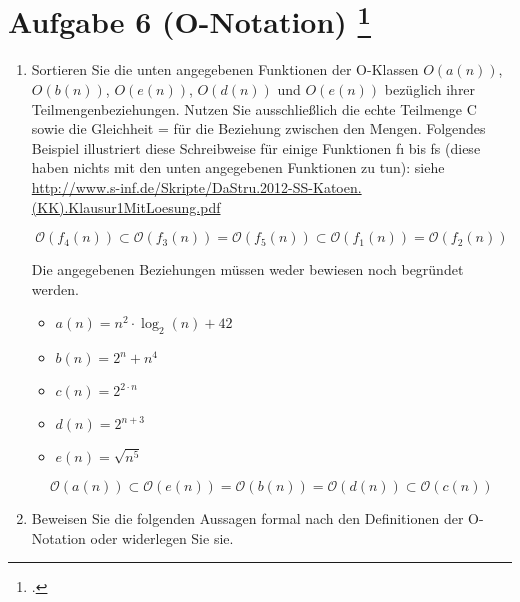 \documentclass{lehramt-informatik-aufgabe}
\begin{document}
\section{Aufgabe 6 (O-Notation)
\footcite{66115:2019:09}}

\begin{enumerate}


\item Sortieren Sie die unten angegebenen Funktionen der
O-Klassen $O(a(n))$, $O(b(n))$, $O(e(n))$, $O(d(n))$ und $O(e(n))$
bezüglich ihrer Teilmengenbeziehungen. Nutzen Sie ausschließlich die
echte Teilmenge C sowie die Gleichheit = für die Beziehung zwischen den
Mengen. Folgendes Beispiel illustriert diese Schreibweise für einige
Funktionen fı bis fs (diese haben nichts mit den unten angegebenen
Funktionen zu tun):
siehe \url{http://www.s-inf.de/Skripte/DaStru.2012-SS-Katoen.(KK).Klausur1MitLoesung.pdf}

\begin{displaymath}
\mathcal{O}(f_4 (n)) \subset \mathcal{O}(f_3(n)) = \mathcal{O}(f_5(n)) \subset \mathcal{O}(f_1(n)) = \mathcal{O}(f_2(n))
\end{displaymath}

Die angegebenen Beziehungen müssen weder bewiesen noch begründet werden.

\begin{itemize}
\item $a(n) = n^2 \cdot \log_2(n) + 42$
\item $b(n) = 2^n + n^4$
\item $c(n) = 2^{2 \cdot n}$
\item $d(n) = 2^{n+3}$
\item $e(n) = \sqrt{n^5}$
\end{itemize}

\begin{antwort}
\begin{displaymath}
\mathcal{O}(a (n)) \subset \mathcal{O}(e(n)) = \mathcal{O}(b(n)) = \mathcal{O}(d(n)) \subset \mathcal{O}(c(n))
\end{displaymath}
\end{antwort}


\item Beweisen Sie die folgenden Aussagen formal nach den Definitionen
der O-Notation oder widerlegen Sie sie.

\begin{enumerate}


\end{enumerate}
\end{enumerate}
\end{document}
